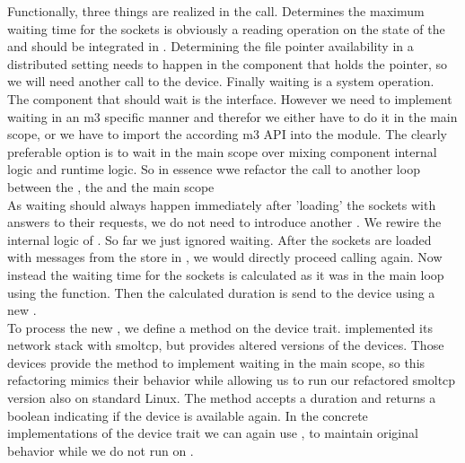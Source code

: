 Functionally, three things are realized in the  call. Determines the maximum waiting time for the sockets is obviously a reading operation on the state of the \stack{} and should be integrated in . Determining the file pointer availability in a distributed setting needs to happen in the component that holds the pointer, so we will need another call to the device. Finally waiting is a system operation. The component that should wait is the interface. However we need to implement waiting in an m3 specific manner and therefor we either have to do it in the main scope, or we have to import the according m3 API into the  module. The clearly preferable option is to wait in the main scope over mixing component internal logic and runtime logic. So in essence wwe refactor the  call to another loop between the \stack{}, the \dev{} and the main scope\\

As waiting should always happen immediately after 'loading' the sockets with answers to their requests, we do not need to introduce another . We rewire the internal logic of . So far we just ignored waiting. After the sockets are loaded with messages from the store in , we would directly proceed calling  again. Now instead the waiting time for the sockets is calculated as it was in the main loop using the  function. Then the calculated duration is send to the device using a new . \\

To process the new , we define a method  on the device trait. \md implemented its network stack with smoltcp, but provides altered versions of the devices. Those devices provide the  method to implement waiting in the main scope, so this refactoring mimics their behavior while allowing us to run our refactored smoltcp version also on standard Linux. The method accepts a duration and returns a boolean indicating if the device is available again. In the concrete implementations of the device trait we can again use , to maintain original behavior while we do not run on \md. \\

